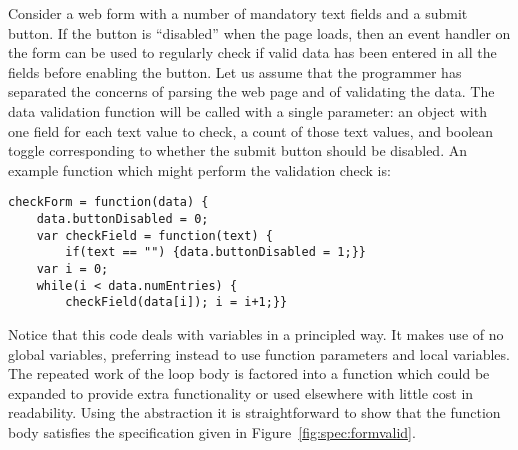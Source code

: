 \documentclass{article}
\begin{document}
%
Consider a web form with a number of mandatory text fields and a submit button.
If the button is ``disabled'' when the page loads, then an event handler on the
form can be used to regularly check if valid data has been entered in all the
fields before enabling the button. Let us assume that the programmer has
separated the concerns of parsing the web page and of validating the data. The
data validation function will be called with a single parameter: an object with
one field for each text value to check, a count of those text values, and
boolean toggle corresponding to whether the submit button should be disabled.
An example function which might perform the validation check is:
        \begin{verbatim}
checkForm = function(data) {
    data.buttonDisabled = 0;
    var checkField = function(text) {
        if(text == "") {data.buttonDisabled = 1;}}
    var i = 0;
    while(i < data.numEntries) {
        checkField(data[i]); i = i+1;}}        
\end{verbatim}
Notice that this code deals with variables in a principled way. It makes use
of no global variables, preferring instead to use function parameters and local
variables. The repeated work of the loop body is factored into a function which
could be expanded to provide extra functionality or used elsewhere with little
cost in readability. Using the \recstore abstraction %
it is straightforward to show that the function body
satisfies the specification given in
Figure~\ref{fig:spec:formvalid}.
\end{document}
